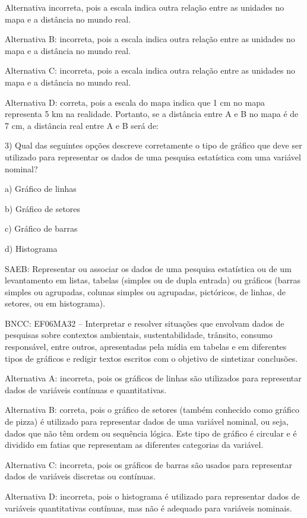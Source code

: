 Alternativa incorreta, pois a escala indica outra relação entre as
unidades no mapa e a distância no mundo real.

Alternativa B: incorreta, pois a escala indica outra relação entre as
unidades no mapa e a distância no mundo real.

Alternativa C: incorreta, pois a escala indica outra relação entre as
unidades no mapa e a distância no mundo real.

Alternativa D: correta, pois a escala do mapa indica que 1 cm no mapa
representa 5 km na realidade. Portanto, se a distância entre A e B no
mapa é de 7 cm, a distância real entre A e B será de:

3) Qual das seguintes opções descreve corretamente o tipo de gráfico que
deve ser utilizado para representar os dados de uma pesquisa estatística
com uma variável nominal?

a) Gráfico de linhas

b) Gráfico de setores

c) Gráfico de barras

d) Histograma

SAEB: Representar ou associar os dados de uma pesquisa estatística ou de
um levantamento em listas, tabelas (simples ou de dupla entrada) ou
gráficos (barras simples ou agrupadas, colunas simples ou agrupadas,
pictóricos, de linhas, de setores, ou em histograma).

BNCC: EF06MA32 -- Interpretar e resolver situações que envolvam dados de
pesquisas sobre contextos ambientais, sustentabilidade, trânsito,
consumo responsável, entre outros, apresentadas pela mídia em tabelas e
em diferentes tipos de gráficos e redigir textos escritos com o objetivo
de sintetizar conclusões.

Alternativa A: incorreta, pois os gráficos de linhas são utilizados para
representar dados de variáveis contínuas e quantitativas.

Alternativa B: correta, pois o gráfico de setores (também conhecido como
gráfico de pizza) é utilizado para representar dados de uma variável
nominal, ou seja, dados que não têm ordem ou sequência lógica. Este tipo
de gráfico é circular e é dividido em fatias que representam as
diferentes categorias da variável.

Alternativa C: incorreta, pois os gráficos de barras são usados para
representar dados de variáveis discretas ou contínuas.

Alternativa D: incorreta, pois o histograma é utilizado para representar
dados de variáveis quantitativas contínuas, mas não é adequado para
variáveis nominais.

